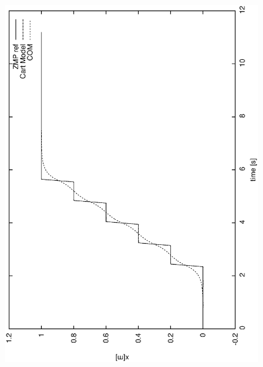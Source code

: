 \begin{figure}[htb]
\begin{center}
\includegraphics[width=\linewidth]{./figures/PatternGenerator/FigurePC1_X}

\end{center}
\end{figure}
